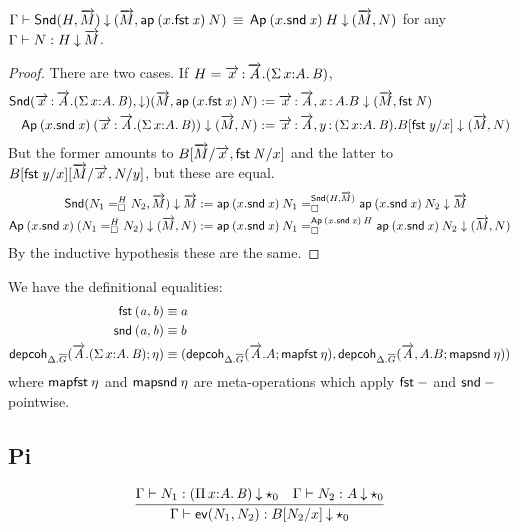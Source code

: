 \begin{lem}
$\deqdepglob\Gamma{\Sndsigma H{\tel M}}{(\tel M,\ap{(x.\fst x)}N)}{\Ap{(x.\snd x)}H}{(\tel M,N)}$ for any
$\ofdepglob\Gamma NH{\tel M}$.
\end{lem}
\begin{proof}
There are two cases. If $H=\teltm xA.(\sigmacl xAB)$,
\[\begin{aligned}
\Sndsigma{\teltm xA.(\sigmacl xAB)}\downarrow(\tel M,\ap{(x.\fst x)}N)
&:= \teltm xA,\tptm xA.B\downarrow(\tel M,\fst N) \\
\Ap{(x.\snd x)}{(\teltm xA.(\sigmacl xAB))}\downarrow(\tel M,N)
&:= \teltm xA,\tptm y{(\sigmacl xAB)}.B[\fst y/x] \downarrow(\tel M,N)
\end{aligned}\]
But the former amounts to $B[\tel M/\tel x,\fst N/x]$ and the latter to $B[\fst
y/x][\tel M/\tel x,N/y]$, but these are equal.
\[\begin{aligned}
\Sndsigma{\dhomj H{N_1}{N_2}\blank}{\tel M}\downarrow\tel M
&:= \dhomj{\Sndsigma H{\tel M}}{\ap{(x.\snd x)}{N_1}}{\ap{(x.\snd x)}{N_2}}{\blank}
\downarrow\tel M \\
\Ap{(x.\snd x)}{(\dhomj H{N_1}{N_2}\blank)}\downarrow(\tel M,N)
&:= \dhomj{\Ap{(x.\snd x)} H}{\ap{(x.\snd x)}{N_1}}{\ap{(x.\snd x)}{N_2}}{\blank}
\downarrow(\tel M,N)
\end{aligned}\]
By the inductive hypothesis these are the same.
\end{proof}


We have the definitional equalities:
\[\begin{aligned}
\fst{(a,b)} &\equiv a \\
\snd{(a,b)} &\equiv b \\
\depcoh{\Delta.\diag G}{\tel A.(\sigmacl xAB)}{\eta} &\equiv
(\depcoh{\Delta.\diag G}{\tel A.A}{\mapfst\eta},
\depcoh{\Delta.\diag G}{\tel A,A.B}{\mapsnd\eta}) \\
\end{aligned}\]
where $\mapfst\eta$ and $\mapsnd\eta$ are meta-operations which apply $\fst-$
and $\snd-$ pointwise.


\subsection{Pi}

\[
\infer
  {\ofdepglob{\Gamma}{\ev{N_1}{N_2}}{B[N_2/x]}{\unitglobelt 0}}
  {\ofdepglob{\Gamma}{N_1}{(\picl xAB)}{\unitglobelt 0}
  &\ofdepglob{\Gamma}{N_2}{A}{\unitglobelt 0}}
\]

